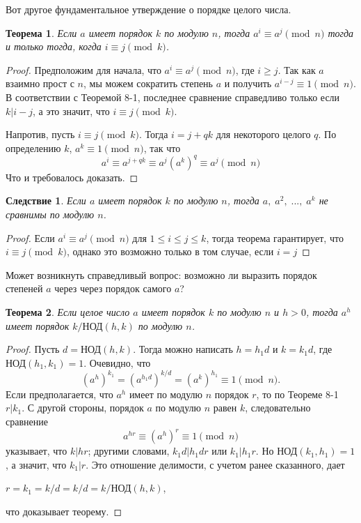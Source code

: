 \documentclass[11pt]{article}
\newtheorem{theorem}{Теорема}
\newtheorem{corollary}{Следствие}
\begin{document}
Вот другое фундаментальное утверждение о порядке целого числа.
\begin{theorem}
	\it Если $a$ имеет порядок $k$ по модулю $n$, тогда $a^i\equiv a^j\pmod{n}$ тогда и только тогда, когда $i\equiv j\pmod{k}$.
\end{theorem}
\begin{proof}
	Предположим для начала, что $a^i\equiv a^j\pmod{n}$, где $i\geq{j}$. Так как $a$ взаимно прост с $n$, мы можем сократить степень $a$ и получить $a^{i-j}\equiv1\pmod{n}$. В соответствии с Теоремой 8-1, последнее сравнение справедливо только если $k|i-j$, а это значит, что $i\equiv j\pmod{k}$.
	
	Напротив, пусть $i\equiv j\pmod{k}$. Тогда $i=j+qk$ для некоторого целого $q$. По определению $k$, $a^k\equiv1\pmod{n}$, так что $$a^i\equiv a^{j+qk}\equiv a^j(a^k)^q \equiv a^j\pmod{n}$$
	Что и требовалось доказать.
\end{proof}
\begin{corollary}
	\it Если $a$ имеет порядок $k$ по модулю $n$, тогда $a,\;a^2,\;...,\;a^k$ не сравнимы по модулю $n$.
\end{corollary}
\newpage
\thispagestyle{fancyEven}
\begin{proof}
	Если $a^i\equiv a^j\pmod{n}$ для $1\leq i\leq j\leq k$, тогда теорема гарантирует, что $i\equiv j\pmod{k}$, однако это возможно только в том случае, если $i=j$
\end{proof}

Может возникнуть справедливый вопрос: возможно ли выразить порядок степеней $a$ через через порядок самого $a$?
\begin{theorem}
	\it Если целое число $a$ имеет порядок $k$ по модулю $n$ и $h>0$, тогда $a^h$ имеет порядок $k/\text{НОД}(h,k)$ по модулю $n$.
\end{theorem}
\begin{proof}
    Пусть $d=\text{НОД}(h,k)$. Тогда можно написать $h=h_1d$ и $k=k_1d$, где $\text{НОД}(h_1,k_1)=1$. Очевидно, что $$(a^h)^{k_1}=(a^{h_1d})^{k/d}=(a^k)^{h_1}\equiv1\pmod{n}.$$
    Если предполагается, что $a^h$ имеет по модулю $n$ порядок $r$, то по Теореме 8-1 $r|k_1$. С другой стороны, порядок $a$ по модулю $n$ равен $k$, следовательно сравнение $$a^{hr}\equiv(a^h)^r\equiv1\pmod{n}$$ указывает, что $k|hr$; другими словами, $k_1d|h_1dr$ или $k_1|h_1r$. Но $\text{НОД}(k_1,h_1)=1$, а значит, что $k_1|r$. Это отношение делимости, с учетом ранее сказанного, дает
    \begin{center}
    $r=k_1=k/d=k/d=k/\text{НОД}(h,k)$,
    \end{center}
    что доказывает теорему.
\end{proof}
\end{document}
